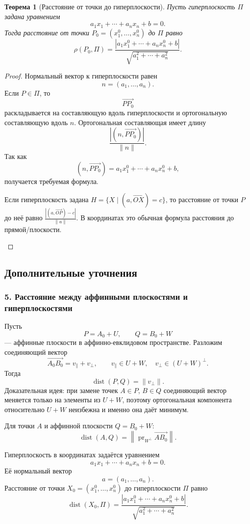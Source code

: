 \documentclass[12pt,a4paper]{article}
\theoremstyle{definition}
\theoremstyle{plain}
\newtheorem{theorem}[definition]{Теорема}
\theoremstyle{remark}
\newenvironment{knowledgefix}{\begin{clarifybox}}{\end{clarifybox}}
\newcommand{\dist}{\operatorname{dist}}
\newcommand{\pr}{\operatorname{pr}}
\begin{document}
\begin{theorem}[Расстояние от точки до гиперплоскости]
Пусть гиперплоскость $\Pi$ задана уравнением
\[
    a_1x_1+\cdots+a_nx_n+b=0.
\]
Тогда расстояние от точки $P_0=(x_1^0,\ldots,x_n^0)$ до $\Pi$ равно
\[
    \rho(P_0,\Pi)
    =\frac{|a_1x_1^0+\cdots+a_nx_n^0+b|}
    {\sqrt{a_1^2+\cdots+a_n^2}}.
\]
\end{theorem}

\begin{proof}
Нормальный вектор к гиперплоскости равен
\[
    n=(a_1,\ldots,a_n).
\]
Если $P\in\Pi$, то
\[
    \overrightarrow{PP_0}
\]
раскладывается на составляющую вдоль гиперплоскости и ортогональную составляющую вдоль $n$. Ортогональная составляющая имеет длину
\[
    \frac{|(n,\overrightarrow{PP_0})|}{\lVert n\rVert}.
\]
Так как
\[
    (n,\overrightarrow{PP_0})=a_1x_1^0+\cdots+a_nx_n^0+b,
\]
получается требуемая формула.
\begin{knowledgefix}
Если гиперплоскость задана \(H=\{X\mid (a,\overrightarrow{OX})=c\}\), то расстояние от точки \(P\) до неё равно \(\frac{|(a,\overrightarrow{OP})-c|}{\|a\|}\). В координатах это обычная формула расстояния до прямой/плоскости.
\end{knowledgefix}
\end{proof}

\subsection*{Дополнительные уточнения}

\subsubsection*{5. Расстояние между аффинными плоскостями и гиперплоскостями}
Пусть
\[
    P=A_0+U,
    \qquad
    Q=B_0+W
\]
--- аффинные плоскости в аффинно-евклидовом пространстве.
Разложим соединяющий вектор
\[
    \overrightarrow{A_0B_0}=v_\parallel+v_\perp,
    \qquad
    v_\parallel\in U+W,
    \quad
    v_\perp\in (U+W)^\perp.
\]
Тогда
\[
    \dist(P,Q)=\|v_\perp\|.
\]
Доказательная идея: при замене точек $A\in P$, $B\in Q$ соединяющий вектор меняется только на элементы из $U+W$, поэтому ортогональная компонента относительно $U+W$ неизбежна и именно она даёт минимум.

Для точки $A$ и аффинной плоскости $Q=B_0+W$:
\[
    \dist(A,Q)=\left\|\pr_{W^\perp}\overrightarrow{AB_0}\right\|.
\]

Гиперплоскость в координатах задаётся уравнением
\[
    a_1x_1+\cdots+a_nx_n+b=0.
\]
Её нормальный вектор
\[
    a=(a_1,\ldots,a_n).
\]
Расстояние от точки $X_0=(x_1^0,\ldots,x_n^0)$ до гиперплоскости $\Pi$ равно
\[
    \dist(X_0,\Pi)=
    \frac{|a_1x_1^0+\cdots+a_nx_n^0+b|}{\sqrt{a_1^2+\cdots+a_n^2}}.
\]
\end{document}
